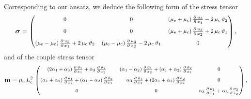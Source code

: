 \documentclass[10pt]{article}
\begin{document}
Corresponding to our ansatz, we deduce 
the following form of the stress tensor 
 \begin{align}\label{stress_tens}
 \boldsymbol{\sigma}=
\begin{footnotesize}\begin{footnotesize}\begin{pmatrix}
0 & 0 & (\mu_{\rm e}+\mu_{\rm c})\,\frac{\partial\, u_{3}}{\partial\,x_1}-2\,\mu_{\rm c}\,\vartheta _2
\vspace{2mm} \\
0 & 0 & (\mu_{\rm e}+\mu_{\rm c})\,\frac{\partial\, u_{3}}{\partial\,x_2}+2\,\mu_{\rm c}\,\vartheta _1
\vspace{2mm} \\
 (\mu_{\rm e}-\mu_{\rm c})\,\frac{\partial\, u_{3}}{\partial\,x_1}+2\,\mu_{\rm c}\,\vartheta _2
 &
  (\mu_{\rm e}-\mu_{\rm c})\,\frac{\partial\, u_{3}}{\partial\,x_2}-2\,\mu_{\rm c}\,\vartheta _1
 &	
0
 \end{pmatrix}\end{footnotesize}\end{footnotesize},
 \end{align}
 and of the couple stress tensor 
 \begin{align}\label{couple_stress_tens}
\mathbf{m}= {\mu_{\rm e}\,L_{\rm c}^2}\,
\begin{footnotesize}\begin{footnotesize}\begin{pmatrix}
({2\alpha_1+\alpha_3})\,\frac{\partial \,\vartheta _{1}}{\partial \,x_1}+\alpha_3\,\frac{\partial \,\vartheta _{2}}{\partial \,x_2}
 &
({\alpha_1-\alpha_2})\,\frac{\partial \,\vartheta _{1}}{\partial \,x_2}+({\alpha_1+\alpha_2})\,\frac{\partial \,\vartheta _{2}}{\partial \,x_1}
 &
0
\vspace{2mm}\\
({\alpha_1+\alpha_2})\,\frac{\partial \,\vartheta _{1}}{\partial \,x_2}+({\alpha_1-\alpha_2})\,\frac{\partial \,\vartheta _{2}}{\partial \,x_1}
 &
 \alpha_3\,\frac{\partial \,\vartheta _{1}}{\partial \,x_1}+({2\alpha_1+\alpha_3})\,\frac{\partial \,\vartheta _{2}}{\partial \,x_2}
 &
0
 \vspace{2mm}\\
 0
 &
0
 &	
 \alpha_3\,\frac{\partial \,\vartheta _{1}}{\partial \,x_1}+\alpha_3\,\frac{\partial \,\vartheta _{2}}{\partial \,x_2}
 \end{pmatrix}\end{footnotesize}\end{footnotesize},
 \end{align}
\end{document}
